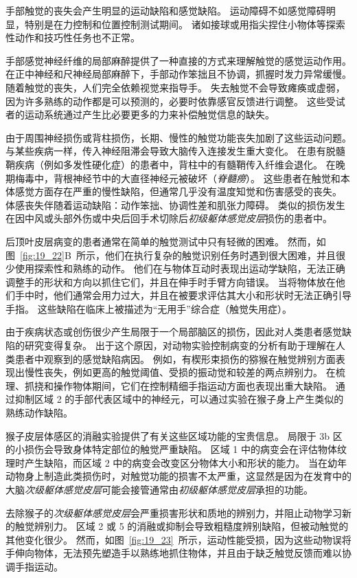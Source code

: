 手部触觉的丧失会产生明显的运动缺陷和感觉缺陷。
运动障碍不如感觉障碍明显，特别是在力控制和位置控制测试期间。
诸如接球或用指尖捏住小物体等探索性动作和技巧性任务也不正常。


手部感觉神经纤维的局部麻醉提供了一种直接的方式来理解触觉的感觉运动作用。
在正中神经和尺神经局部麻醉下，手部动作笨拙且不协调，抓握时发力异常缓慢。
随着触觉的丧失，人们完全依赖视觉来指导手。
失去触觉不会导致瘫痪或虚弱，因为许多熟练的动作都是可以预测的，必要时依靠感官反馈进行调整。
这些受试者的运动系统通过产生比必要更多的力来补偿触觉信息的缺失。


由于周围神经损伤或背柱损伤，长期、慢性的触觉功能丧失加剧了这些运动问题。
与某些疾病一样，传入神经阻滞会导致大脑传入连接发生重大变化。
在患有脱髓鞘疾病（例如多发性硬化症）的患者中，背柱中的有髓鞘传入纤维会退化。
在晚期梅毒中，背根神经节中的大直径神经元被破坏（\textit{脊髓痨}）。
这些患者在触觉和本体感觉方面存在严重的慢性缺陷，但通常几乎没有温度知觉和伤害感受的丧失。
体感丧失伴随着运动缺陷：动作笨拙、协调性差和肌张力障碍。
类似的损伤发生在因中风或头部外伤或中央后回手术切除后\textit{初级躯体感觉皮层}损伤的患者中。


后顶叶皮层病变的患者通常在简单的触觉测试中只有轻微的困难。
然而，如图~\ref{fig:19_22}B~所示，他们在执行复杂的触觉识别任务时遇到很大困难，并且很少使用探索性和熟练的动作。
他们在与物体互动时表现出运动学缺陷，无法正确调整手的形状和方向以抓住它们，并且在伸手时手臂方向错误。 
当将物体放在他们手中时，他们通常会用力过大，并且在被要求评估其大小和形状时无法正确引导手指。
这些缺陷在临床上被描述为“无用手”综合症（触觉失用症）。


由于疾病状态或创伤很少产生局限于一个局部脑区的损伤，因此对人类患者感觉缺陷的研究变得复杂。
出于这个原因，对动物实验控制病变的分析有助于理解在人类患者中观察到的感觉缺陷病因。
例如，有楔形束损伤的猕猴在触觉辨别方面表现出慢性丧失，例如更高的触觉阈值、受损的振动觉和较差的两点辨别力。
在梳理、抓挠和操作物体期间，它们在控制精细手指运动方面也表现出重大缺陷。
通过抑制区域 2 的手部代表区域中的神经元，可以通过实验在猴子身上产生类似的熟练动作缺陷。


猴子皮层体感区的消融实验提供了有关这些区域功能的宝贵信息。
局限于 3b 区的小损伤会导致身体特定部位的触觉严重缺陷。
区域 1 中的病变会在评估物体纹理时产生缺陷，而区域 2 中的病变会改变区分物体大小和形状的能力。
当在幼年动物身上制造此类损伤时，对触觉功能的损害不太严重，这显然是因为在发育中的大脑\textit{次级躯体感觉皮层}可能会接管通常由\textit{初级躯体感觉皮层}承担的功能。


去除猴子的\textit{次级躯体感觉皮层}会严重损害形状和质地的辨别力，并阻止动物学习新的触觉辨别力。
区域 2 或 5 的消融或抑制会导致粗糙度辨别缺陷，但被动触觉的其他变化很少。
然而，如图~\ref{fig:19_23}~所示，运动性能受损，因为这些动物误将手伸向物体，无法预先塑造手以熟练地抓住物体，并且由于缺乏触觉反馈而难以协调手指运动。


